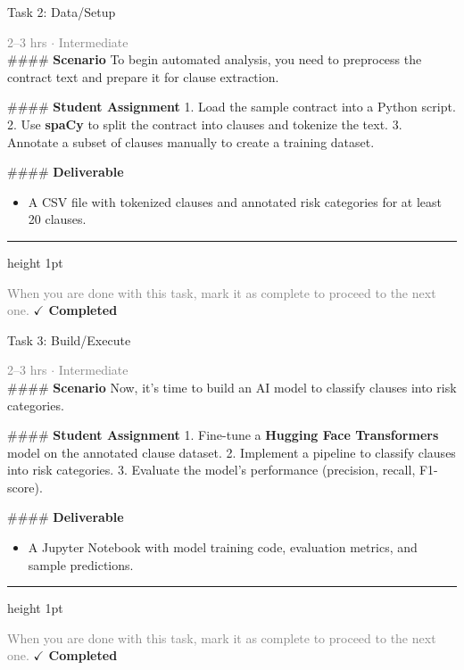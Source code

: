\documentclass[10pt,a4paper]{article}
\begin{document}
\begin{taskbox}{Task 2: Data/Setup}

    {\small \textcolor{gray}{2--3 hrs $\cdot$ Intermediate}}\\[12pt]

    \#\#\#\# \textbf{Scenario}  
To begin automated analysis, you need to preprocess the contract text and prepare it for clause extraction.  

\#\#\#\# \textbf{Student Assignment}  
1. Load the sample contract into a Python script.  
2. Use \textbf{spaCy} to split the contract into clauses and tokenize the text.  
3. Annotate a subset of clauses manually to create a training dataset.  

\#\#\#\# \textbf{Deliverable}  
\begin{itemize}
    \item A CSV file with tokenized clauses and annotated risk categories for at least 20 clauses.\par
\end{itemize}

    \vspace{16pt}

    \textcolor{cardBorder}{\hrule height 1pt}\vspace{8pt}

    \small \textcolor{gray}{When you are done with this task, mark it as complete to proceed to the next one.} \hfill \textbf{\textcolor{brandDark}{$\checkmark$ Completed}}

\end{taskbox}

\begin{taskbox}{Task 3: Build/Execute}

    {\small \textcolor{gray}{2--3 hrs $\cdot$ Intermediate}}\\[12pt]

    \#\#\#\# \textbf{Scenario}  
Now, it’s time to build an AI model to classify clauses into risk categories.  

\#\#\#\# \textbf{Student Assignment}  
1. Fine-tune a \textbf{Hugging Face Transformers} model on the annotated clause dataset.  
2. Implement a pipeline to classify clauses into risk categories.  
3. Evaluate the model's performance (precision, recall, F1-score).  

\#\#\#\# \textbf{Deliverable}  
\begin{itemize}
    \item A Jupyter Notebook with model training code, evaluation metrics, and sample predictions.\par
\end{itemize}

    \vspace{16pt}

    \textcolor{cardBorder}{\hrule height 1pt}\vspace{8pt}

    \small \textcolor{gray}{When you are done with this task, mark it as complete to proceed to the next one.} \hfill \textbf{\textcolor{brandDark}{$\checkmark$ Completed}}

\end{taskbox}
\end{document}
